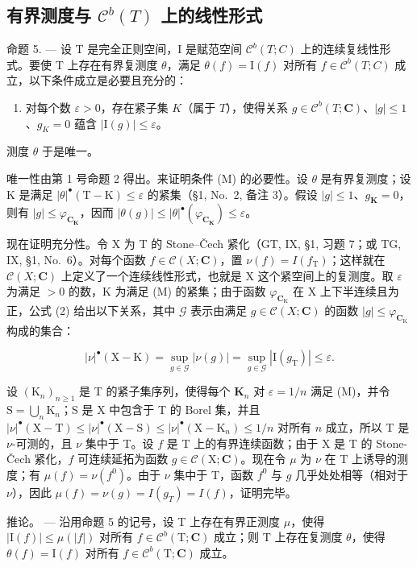 \subsection{\texorpdfstring{有界测度与 \(\mathcal{C}^{b}(T)\) 上的线性形式}{有界测度与 \textbackslash mathcal\{C\}\^{}\{b\}(T) 上的线性形式}}

命题 5. --- 设 T 是完全正则空间，I 是赋范空间 \(\mathcal{C}^{b}(T;C)\) 上的连续复线性形式。要使 T 上存在有界复测度 \(\theta\)，满足 \(\theta(f)=\mathrm{I}(f)\) 对所有 \(f\in\mathcal{C}^{b}(T;C)\) 成立，以下条件成立是必要且充分的：

\begin{enumerate}
\def\labelenumi{(\Alph{enumi})}
\setcounter{enumi}{12}
\tightlist
\item
  对每个数 \(\varepsilon > 0\)，存在紧子集 \(K\)（属于 \(T\)），使得关系 \(g \in \mathcal{C}^b(T; \mathbf{C})\)、\(|g| \leqslant 1\)、\(g_K = 0\) 蕴含 \(|\mathrm{I}(g)| \leqslant \varepsilon\)。
\end{enumerate}

测度 \(\theta\) 于是唯一。

唯一性由第 1 号命题 2 得出。来证明条件 (M) 的必要性。设 \(\theta\) 是有界复测度；设 K 是满足 \(|\theta|^{\bullet}(\mathrm{T}-\mathrm{K}) \leqslant \varepsilon\) 的紧集（§1, No.~2, 备注 3）。假设 \(|g| \leqslant 1\)、\(g_{\mathbf{K}} = 0\)，则有 \(|g| \leqslant \varphi_{\mathbf{C}_{\mathbf{K}}}\)，因而 \(|\theta(g)| \leqslant |\theta|^{\bullet}(\varphi_{\mathbf{C}_{\mathbf{K}}}) \leqslant \varepsilon\)。

现在证明充分性。令 X 为 T 的 Stone--Čech 紧化（GT, IX, §1, 习题 7；或 TG, IX, §1, No.~6）。对每个函数 \(f \in \mathcal{C}(X; \mathbf{C})\)，置 \(\nu(f) = I(f_{\mathrm{T}})\)；这样就在 \(\mathcal{C}(X; \mathbf{C})\) 上定义了一个连续线性形式，也就是 X 这个紧空间上的复测度。取 \(\varepsilon\) 为满足 \(>0\) 的数，K 为满足 (M) 的紧集；由于函数 \(\varphi_{\mathbf{C}_{\mathrm{K}}}\) 在 X 上下半连续且为正，公式 (2) 给出以下关系，其中 \(\mathcal{G}\) 表示由满足 \(g \in \mathcal{C}(X; \mathbf{C})\) 的函数 \(|g| \leqslant \varphi_{\mathbf{C}_{\mathrm{K}}}\) 构成的集合：

\[
| \nu | ^ {\bullet} (\mathrm{X} - \mathrm{K}) = \sup _ {g \in \mathcal {G}} | \nu (g) | = \sup _ {g \in \mathcal {G}} | \mathrm{I} (g _ {\mathrm{T}}) | \leqslant \varepsilon .
\]

设 \((\mathrm{K}_n)_{n\geqslant 1}\) 是 T 的紧子集序列，使得每个 \(\mathbf{K}_n\) 对 \(\varepsilon = 1 / n\) 满足 (M)，并令 \(\mathrm{S} = \bigcup_{n}\mathrm{K}_{n}\)；S 是 X 中包含于 T 的 Borel 集，并且 \(|\nu|^{\bullet}(\mathrm{X} - \mathrm{T})\leqslant |\nu |^{\bullet}(\mathrm{X} - \mathrm{S})\leqslant |\nu |^{\bullet}(\mathrm{X} - \mathrm{K}_n)\leqslant 1 / n\) 对所有 \(n\) 成立，所以 T 是 \(\nu\)-可测的，且 \(\nu\) 集中于 T。设 \(f\) 是 T 上的有界连续函数；由于 X 是 T 的 Stone-Čech 紧化，\(f\) 可连续延拓为函数 \(g\in \mathcal{C}(\mathrm{X};\mathbf{C})\)。现在令 \(\mu\) 为 \(\nu\) 在 T 上诱导的测度；有 \(\mu(f) = \nu(f^0)\)。由于 \(\nu\) 集中于 T，函数 \(f^0\) 与 \(g\) 几乎处处相等（相对于 \(\nu\)），因此 \(\mu(f) = \nu(g) = I(g_T) = I(f)\)，证明完毕。

推论。 --- 沿用命题 5 的记号，设 T 上存在有界正测度 \(\mu\)，使得 \(|\mathrm{I}(f)| \leqslant \mu(|f|)\) 对所有 \(f \in \mathcal{C}^b(\mathrm{T};\mathbf{C})\) 成立；则 T 上存在复测度 \(\theta\)，使得 \(\theta(f) = \mathrm{I}(f)\) 对所有 \(f \in \mathcal{C}^b(\mathrm{T};\mathbf{C})\) 成立。

